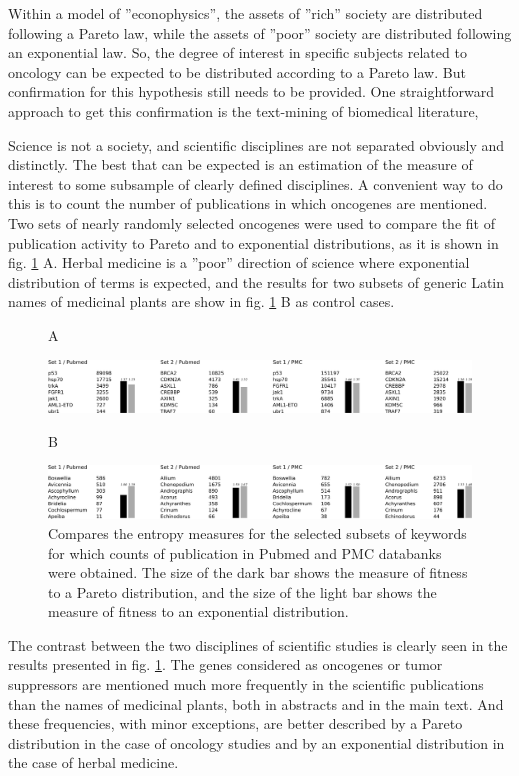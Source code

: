 \documentclass[12pt,aps]{revtex4}
\begin{document}
Within a model of ''econophysics'', the assets of ''rich'' society are distributed following a Pareto law, while the assets of ''poor'' society are distributed following an exponential law. So, the degree of interest in specific subjects related to oncology can be expected to be distributed according to a Pareto law. But confirmation for this hypothesis still needs to be provided. One straightforward approach to get this confirmation is the text-mining of biomedical literature,

Science is not a society, and scientific disciplines are not separated obviously and distinctly. The best that can be expected is an estimation of the measure of interest to some subsample of clearly defined disciplines. A convenient way to do this is to count the number of publications in which oncogenes are mentioned.  Two sets of nearly randomly selected oncogenes were used to compare the fit of publication activity to Pareto and to exponential distributions, as it is shown in fig. \ref{oncology_pareto} A. Herbal medicine is a ''poor'' direction of science where exponential distribution of terms is expected, and the results for two subsets of generic Latin names of medicinal plants are show in fig. \ref{oncology_pareto} B as control cases.

\begin{figure}[h]
\flushleft \large \textsf{A}\\
\vskip 6pt
\centerline{\includegraphics[width=\columnwidth]{oncogenes_pareto.png}}
\flushleft \large \textsf{B}\\
\vskip 6pt
\centerline{\includegraphics[width=\columnwidth]{herbal_pareto.png}}
\caption{Compares the entropy measures for the selected subsets of keywords for which counts of publication in Pubmed and PMC databanks were obtained. The size of the dark bar shows the measure of fitness to a Pareto distribution, and the size of the light bar shows the measure of fitness to an exponential distribution. 
}
\label{oncology_pareto}
\end{figure}

The contrast between the two disciplines of scientific studies is clearly seen in the results presented in fig. \ref{oncology_pareto}. The genes considered as oncogenes or tumor suppressors are mentioned much more frequently in the scientific publications than the names of medicinal plants, both in abstracts and in the main text. And these frequencies, with minor exceptions, are better described by a Pareto distribution in the case of oncology studies and by an exponential distribution in the case of herbal medicine.    
\end{document}
